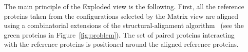 \documentclass{bmcart}
\def\ExpView {Exploded view\xspace}
\def\MatView {Matrix view\xspace}
\begin{document}


The main principle of the \ExpView is the following.
First, all the reference proteins taken from the configurations selected by the \MatView are aligned using a combinatorial extensions of the structural-alignment algorithm~\cite{Shindyalov1998} (see the green proteins in Figure~\ref{fig:problem}).
The set of paired proteins interacting with the reference proteins is positioned around the aligned reference proteins.
\end{document}
